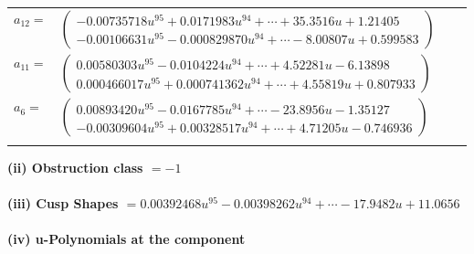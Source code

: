 \documentclass[1p]{elsarticle_modified}
\theoremstyle{definition}
\begin{document}
\begin{tabular}{m{7pt} m{180pt} m{7pt} m{180pt} }
\flushright $a_{12}=$&$\begin{pmatrix}-0.00735718 u^{95}+0.0171983 u^{94}+\cdots+35.3516 u+1.21405\\-0.00106631 u^{95}-0.000829870 u^{94}+\cdots-8.00807 u+0.599583\end{pmatrix}$ \\
\flushright $a_{11}=$&$\begin{pmatrix}0.00580303 u^{95}-0.0104224 u^{94}+\cdots+4.52281 u-6.13898\\0.000466017 u^{95}+0.000741362 u^{94}+\cdots+4.55819 u+0.807933\end{pmatrix}$ \\
\flushright $a_{6}=$&$\begin{pmatrix}0.00893420 u^{95}-0.0167785 u^{94}+\cdots-23.8956 u-1.35127\\-0.00309604 u^{95}+0.00328517 u^{94}+\cdots+4.71205 u-0.746936\end{pmatrix}$\\&\end{tabular}
\flushleft \textbf{(ii) Obstruction class $= -1$}\\~\\
\flushleft \textbf{(iii) Cusp Shapes $= 0.00392468 u^{95}-0.00398262 u^{94}+\cdots-17.9482 u+11.0656$}\\~\\
\newpage\renewcommand{\arraystretch}{1}
\flushleft \textbf{(iv) u-Polynomials at the component}\newline \\
\end{document}
